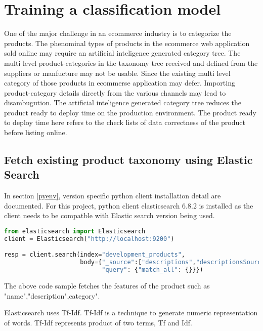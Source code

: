 
\chapter{Training a classification model}

One of the major challenge in an ecommerce industry is to categorize the products. The phenominal types of products in the ecommerce web application sold online may require an artificial inteligence generated category tree. The multi level product-categories in the taxonomy tree received and defined from the suppliers or manfucture may not be usable. Since the existing multi level category of those products in ecommerse application may defer. Importing product-category details directly from the various channels may lead to disambugution. The artificial inteligence generated category tree reduces the product ready to deploy time on the production environment. The product ready to deploy time here refers to the check lists of data correctness of the product before listing online.

\section {Fetch existing product taxonomy using Elastic Search}

In section \ref {pyenv}, version specific python client installation detail are documented. For this project, python client elasticsearch 6.8.2 is installed as the client needs to be compatble with Elastic search version being used.


\begin{lstlisting}[language=Python]
from elasticsearch import Elasticsearch
client = Elasticsearch("http://localhost:9200")

resp = client.search(index="development_products",
                     body={"_source":["descriptions","descriptionsSource","nameSource","shortDescriptionSource","categoriesSource"],
                           "query": {"match_all": {}}})
\end{lstlisting}

The above code sample fetches the features of the product such as "name","description",category".


Elasticsearch uses \acf{Tf-Idf}. \acs{Tf-Idf} is a technique to generate numeric representation of words. \acs{Tf-Idf} represents product of two terms, \acs{Tf} and \acs{Idf}.


